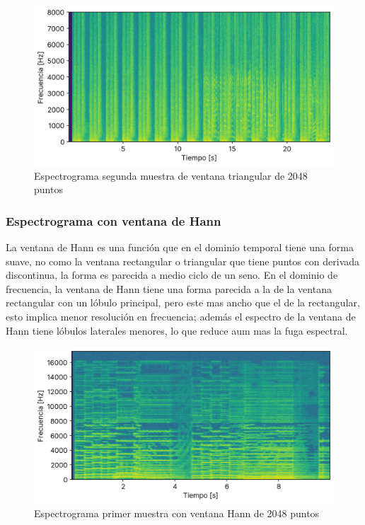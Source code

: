 \documentclass[12pt]{article}
\begin{document}
\begin{figure}[H]
\centering
\includegraphics{plot/cancion2_espectograma_bartlett_2048.png}
\caption{Espectrograma segunda muestra de ventana triangular de 2048 puntos}
\label{cancion2_espectograma_bartlett_2048}
\end{figure}
\fi

\hypertarget{espectograma-ventana-hann}{%
\subsubsection{Espectrograma con ventana de Hann}\label{espectograma-ventana-hann}}

La ventana de Hann es una función que en el dominio temporal tiene una forma
suave, no como la ventana rectangular o triangular que tiene puntos con derivada
discontinua, la forma es parecida a medio ciclo de un seno. En el dominio de
frecuencia, la ventana de Hann tiene una forma parecida a la de la ventana
rectangular con un lóbulo principal, pero este mas ancho que el de la
rectangular, esto implica menor resolución en frecuencia; además el espectro de
la ventana de Hann tiene lóbulos laterales menores, lo que reduce aum mas la fuga espectral.

\begin{figure}[H]
\centering
\includegraphics{plot/cancion1_espectograma_hann_2048.png}
\caption{Espectrograma primer muestra con ventana Hann de 2048 puntos}
\label{cancion1_espectograma_hann_2048}
\end{figure}
\end{document}
